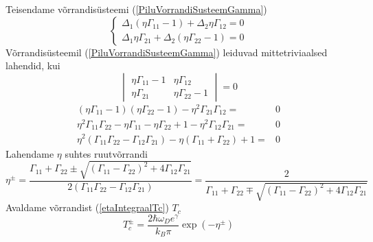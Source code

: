 \documentclass[class=article, crop=false]{standalone}
\begin{document}
Teisendame võrrandisüsteemi (\ref{PiluVorrandiSusteemGamma})
\begin{equation}\label{PiluVorrandiSusteemTc}
	\begin{cases}
		\Delta_{1} \left( \eta \Gamma_{11} - 1 \right) + \Delta_{2} \eta \Gamma_{12} = 0 \\
		\Delta_{1} \eta \Gamma_{21} + \Delta_{2} \left( \eta \Gamma_{22} - 1 \right) = 0
	\end{cases}
\end{equation}
Võrrandisüsteemil (\ref{PiluVorrandiSusteemGamma}) leiduvad mittetriviaalsed lahendid, kui
\begin{equation}
	\begin{vmatrix}
		\eta \Gamma_{11} - 1 & \eta \Gamma_{12} \\
		\eta \Gamma_{21} & \eta \Gamma_{22} - 1
	\end{vmatrix}
	= 0
\end{equation}
\begin{equation}
	\begin{split}
		\left( \eta \Gamma_{11} - 1 \right) \left( \eta \Gamma_{22} - 1 \right) - \eta^{2} \Gamma_{21} \Gamma_{12} = & 0 \\
		\eta^{2} \Gamma_{11} \Gamma_{22} - \eta \Gamma_{11} - \eta \Gamma_{22} + 1 - \eta^{2} \Gamma_{12} \Gamma_{21} = & 0 \\
		\eta^{2} \left( \Gamma_{11} \Gamma_{22} - \Gamma_{12} \Gamma_{21} \right) - \eta \left( \Gamma_{11} + \Gamma_{22} \right) + 1 = & 0
	\end{split}
\end{equation}
Lahendame $ \eta $ suhtes ruutvõrrandi
\begin{equation}
	\eta^{ \pm} = \frac{ \Gamma_{11} + \Gamma_{22} \pm \sqrt{ \left( \Gamma_{11} - \Gamma_{22} \right)^{2} + 4 \Gamma_{12} \Gamma_{21}}}{2 \left( \Gamma_{11} \Gamma_{22} - \Gamma_{12} \Gamma_{21} \right)} = \frac{2}{ \Gamma_{11} + \Gamma_{22} \mp \sqrt{ \left( \Gamma_{11} - \Gamma_{22} \right)^{2} + 4 \Gamma_{12} \Gamma_{21}}}
\end{equation}
Avaldame võrrandist (\ref{etaIntegraalTc}) $ T_{c} $
\begin{equation}
	T_{c}^{ \pm} = \frac{2 \hbar \omega_{D} e^{ \gamma}}{k_{B} \pi} \exp \left( - \eta^{ \pm} \right)
\end{equation}
\end{document}
